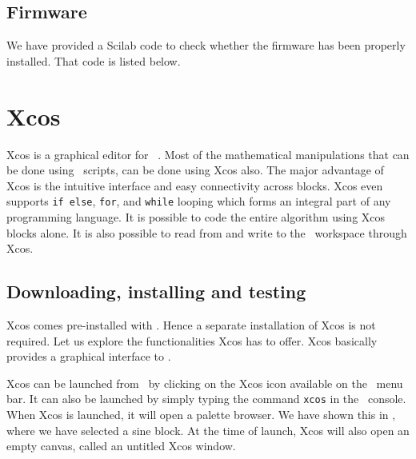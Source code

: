 \subsection{Firmware}
\lstset{style=mystyle}
\label{sec:test-firmware-scilab}
We have provided a Scilab code to check whether the firmware has been
properly installed.  That code is listed below.

\begin{scicode}
      \label{sci:test-firmware}
      
\end{scicode}


\section{Xcos}
\label{sec:xcos-start}
Xcos is a graphical editor for \scilab\ \cite{xcos-ref}. Most of the
mathematical manipulations that can be done using \scilab\ scripts,
can be done using Xcos also.  The major advantage of Xcos is the
intuitive interface and easy connectivity across blocks. Xcos even
supports {\tt if else}, {\tt for}, and {\tt while} looping which forms
an integral part of any programming language. It is possible to code
the entire algorithm using Xcos blocks alone. It is also possible to
read from and write to the \scilab\ workspace through Xcos.

\subsection{Downloading, installing and testing}
Xcos comes pre-installed with \scilab. Hence a separate installation
of Xcos is not required. Let us explore the functionalities Xcos has
to offer. Xcos basically provides a graphical interface to \scilab.  

Xcos can be launched from \scilab\ by clicking on the Xcos icon
available on the \scilab\ menu bar. It can also be launched by simply
typing the command {\tt xcos} in the \scilab\ console. When Xcos is
launched, it will open a palette browser.  We have shown this in
, where we have selected a sine block.  At the time
of launch, Xcos will also open an empty canvas, called an untitled
Xcos window.


